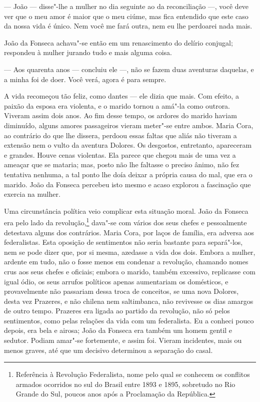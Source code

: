 \begin{linenumbers}
--- João --- disse"-lhe a mulher no dia seguinte ao da reconciliação ---,
você deve ver que o meu amor é maior que o meu ciúme, mas fica entendido
que este caso da nossa vida é único. Nem você me fará outra, nem eu lhe
perdoarei nada mais.

João da Fonseca achava"-se então em um renascimento do delírio conjugal;
respondeu à mulher jurando tudo e mais alguma coisa.

--- Aos quarenta anos --- concluiu ele ---, não se fazem duas aventuras
daquelas, e a minha foi de doer. Você verá, agora é para sempre.

A vida recomeçou tão feliz, como dantes --- ele dizia que mais. Com
efeito, a paixão da esposa era violenta, e o marido tornou a amá"-la como
outrora. Viveram assim dois anos. Ao fim desse tempo, os ardores do
marido haviam diminuído, alguns amores passageiros vieram meter"-se entre
ambos. Maria Cora, ao contrário do que lhe dissera, perdoou essas faltas
que aliás não tiveram a extensão nem o vulto da aventura Dolores. Os
desgostos, entretanto, apareceram e grandes. Houve cenas violentas. Ela
parece que chegou mais de uma vez a ameaçar que se mataria; mas, posto
não lhe faltasse o preciso ânimo, não fez tentativa nenhuma, a tal ponto
lhe doía deixar a própria causa do mal, que era o marido. João da
Fonseca percebeu isto mesmo e acaso explorou a fascinação que exercia na
mulher.

Uma circunstância política veio complicar esta situação moral. João da
Fonseca era pelo lado da revolução,\footnote{Referência à Revolução
  Federalista, nome pelo qual se conhecem os conflitos armados ocorridos
  no sul do Brasil entre 1893 e 1895, sobretudo no Rio Grande do Sul,
  poucos anos após a Proclamação da República.} dava"-se com vários dos
seus chefes e pessoalmente detestava alguns dos contrários. Maria Cora,
por laços de família, era adversa aos federalistas. Esta oposição de
sentimentos não seria bastante para separá"-los, nem se pode dizer que,
por si mesma, azedasse a vida dos dois. Embora a mulher, ardente em
tudo, não o fosse menos em condenar a revolução, chamando nomes crus aos
seus chefes e oficiais; embora o marido, também excessivo, replicasse
com igual ódio, os seus arrufos políticos apenas aumentariam os
domésticos, e provavelmente não passariam dessa troca de conceitos, se
uma nova Dolores, desta vez Prazeres, e não chilena nem saltimbanca, não
revivesse os dias amargos de outro tempo. Prazeres era ligada ao partido
da revolução, não só pelos sentimentos, como pelas relações da vida com
um federalista. Eu a conheci pouco depois, era bela e airosa; João da
Fonseca era também um homem gentil e sedutor. Podiam amar"-se fortemente,
e assim foi. Vieram incidentes, mais ou menos graves, até que um
decisivo determinou a separação do casal.


\end{linenumbers}
